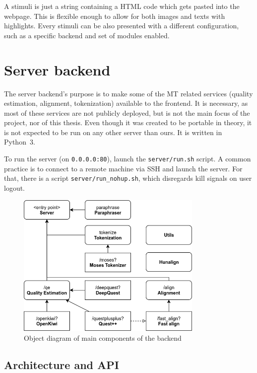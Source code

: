 A stimuli is just a string containing a HTML code which gets pasted into the webpage. This is flexible enough to allow for both images and texts with highlights. Every stimuli can be also presented with a different configuration, such as a specific backend and set of modules enabled.


\section{Server backend}
\label{sec:server-backend}

The server backend's purpose is to make some of the MT related services (quality estimation, alignment, tokenization) available to the frontend. It is necessary, as most of these services are not publicly deployed, but is not the main focus of the \ptakopet{} project, nor of this thesis. Even though it was created to be portable in theory, it is not expected to be run on any other server than ours. It is written in Python~3.

To run the server (on \texttt{0.0.0.0:80}), launch the \texttt{server/run.sh} script. A common practice is to connect to a remote machine via SSH and launch the server. For that, there is a script \texttt{server/run\_nohup.sh}, which disregards kill signals on user logout.

\begin{figure}[ht]
    \centering
    \includegraphics[width=0.8\textwidth]{img/implementation/backend.png}
    \caption{Object diagram of main components of the \ptakopet{} backend}
    \label{fig:backend_class}
\end{figure}

\subsection{Architecture and API}

